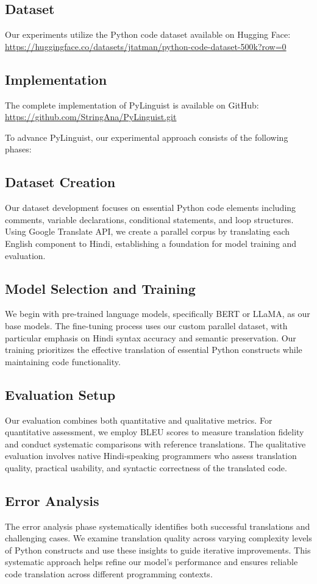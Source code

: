 \documentclass[9pt]{article}
\begin{document}
\subsection{Dataset}
Our experiments utilize the Python code dataset available on Hugging Face:
\url{https://huggingface.co/datasets/jtatman/python-code-dataset-500k?row=0}


\subsection{Implementation}
The complete implementation of PyLinguist is available on GitHub:
\url{https://github.com/StringAna/PyLinguist.git}

\noindent To advance PyLinguist, our experimental approach consists of the following phases:
\subsection{Dataset Creation}
Our dataset development focuses on essential Python code elements including comments, variable declarations, conditional statements, and loop structures. Using Google Translate API, we create a parallel corpus by translating each English component to Hindi, establishing a foundation for model training and evaluation.

\subsection{Model Selection and Training}
We begin with pre-trained language models, specifically BERT or LLaMA, as our base models. The fine-tuning process uses our custom parallel dataset, with particular emphasis on Hindi syntax accuracy and semantic preservation. Our training prioritizes the effective translation of essential Python constructs while maintaining code functionality.

\subsection{Evaluation Setup}
Our evaluation combines both quantitative and qualitative metrics. For quantitative assessment, we employ BLEU scores to measure translation fidelity and conduct systematic comparisons with reference translations. The qualitative evaluation involves native Hindi-speaking programmers who assess translation quality, practical usability, and syntactic correctness of the translated code.

\subsection{Error Analysis}
The error analysis phase systematically identifies both successful translations and challenging cases. We examine translation quality across varying complexity levels of Python constructs and use these insights to guide iterative improvements. This systematic approach helps refine our model's performance and ensures reliable code translation across different programming contexts.
\end{document}
